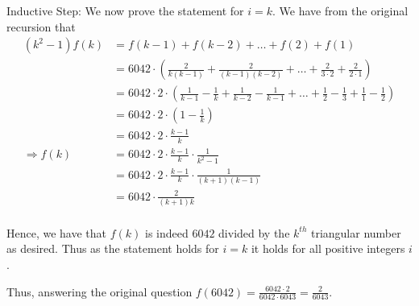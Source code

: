 \documentclass[twoside,12pt]{article}
\begin{document}
\begin{problem}{25}
{Inductive Step:  We now prove the statement for $i = k$.  We have from the original recursion that 
\begin{equation*}
\begin{split}
(k^2 - 1)f(k) &= f(k-1) + f(k-2) + \ldots + f(2) + f(1) \\
&= 6042 \cdot \left(\frac{2}{k(k-1)} + \frac{2}{(k-1)(k-2)}  + \ldots + \frac{2}{3 \cdot 2} + \frac{2}{2 \cdot 1}  \right)\\
&= 6042 \cdot 2 \cdot \left(\frac{1}{k-1} - \frac{1}{k}  + \frac{1}{k-2} - \frac{1}{k-1}  + \ldots + \frac{1}{2}  - \frac{1}{3} + \frac{1}{1} - \frac{1}{2}  \right)\\
&= 6042 \cdot 2 \cdot \left(1 - \frac{1}{k}\right) \\
&= 6042 \cdot 2 \cdot \frac{k-1}{k} \\
\Rightarrow f(k) &= 6042 \cdot 2 \cdot \frac{k-1}{k} \cdot \frac{1}{k^2-1} \\
&= 6042 \cdot 2 \cdot \frac{k-1}{k} \cdot \frac{1}{(k+1)(k-1)} \\
&= 6042 \cdot \frac{2}{(k+1)k} \\
\end{split}
\end{equation*}

Hence, we have that $f(k)$ is indeed $6042$ divided by the $k^{th}$ triangular number as desired.  Thus as the statement holds for $i = k$ it holds for all positive integers $i$.  

Thus, answering the original question $f(6042) = \frac{6042 \cdot 2	}{6042 \cdot 6043} = \frac{2}{6043}$.

}

\eparts

\end{problem}
\end{document}
